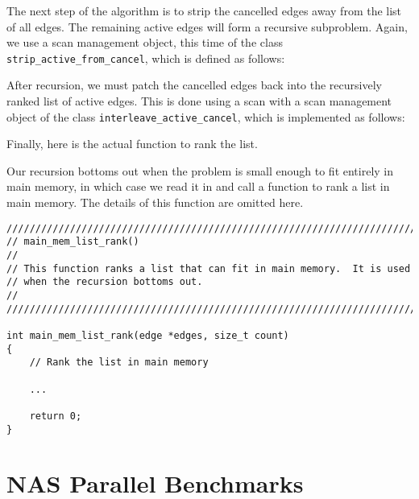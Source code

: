 The next step of the algorithm is to strip the cancelled edges away
from the list of all edges.  The remaining active edges will form a
recursive subproblem.  Again, we use a scan management object, this
time of the class \lstinline|strip_active_from_cancel|, which is defined as
follows:



After recursion, we must patch the cancelled edges back into the
recursively ranked list of active edges.  This is done using a scan
with a scan management object of the class
\lstinline|interleave_active_cancel|, which is implemented as follows:



Finally, here is the actual function to rank the list.



Our recursion bottoms out when the problem is small enough to fit
entirely in main memory, in which case we read it in and call a
function to rank a list in main memory.  The details of this function
are omitted here.

\begin{lstlisting}[basicstyle=\ttfamily\small,caption={Code taken from \texttt{tpie\_\version/apps/list\_rank/lr.cpp}}]
////////////////////////////////////////////////////////////////////////
// main_mem_list_rank()
//
// This function ranks a list that can fit in main memory.  It is used
// when the recursion bottoms out.
//
////////////////////////////////////////////////////////////////////////

int main_mem_list_rank(edge *edges, size_t count)
{
    // Rank the list in main memory

    ...
        
    return 0;  
}
\end{lstlisting}

\section{NAS Parallel Benchmarks}

